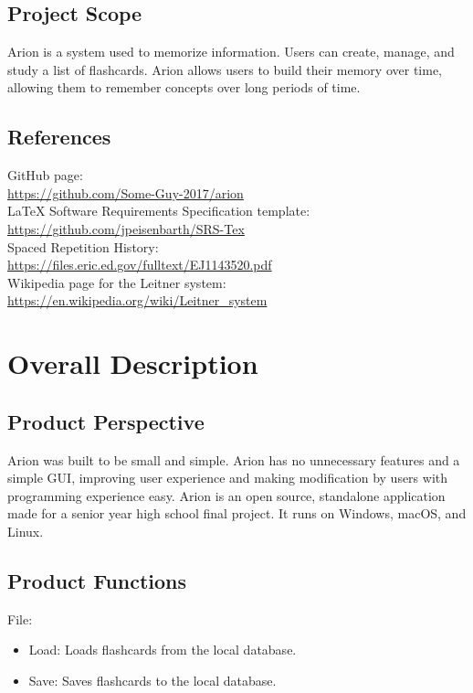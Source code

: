 \documentclass{scrreprt}
\begin{document}
\section{Project Scope}
Arion is a system used to memorize information. Users can create, manage, and study a list of flashcards.
Arion allows users to build their memory over time, allowing them to remember concepts over long periods of time.

\section{References}
\begin{flushleft} 
    GitHub page: \\
    \url{https://github.com/Some-Guy-2017/arion} \\
    LaTeX Software Requirements Specification template: \\
    \url{https://github.com/jpeisenbarth/SRS-Tex} \\
    Spaced Repetition History: \\
    \url{https://files.eric.ed.gov/fulltext/EJ1143520.pdf} \\
    Wikipedia page for the Leitner system: \\
    \url{https://en.wikipedia.org/wiki/Leitner_system} \\
\end{flushleft}


\chapter{Overall Description}

\section{Product Perspective}
Arion was built to be small and simple.
Arion has no unnecessary features and a simple GUI, improving user experience and making modification by users
with programming experience easy.
Arion is an open source, standalone application made for a senior year high school final project.
It runs on Windows, macOS, and Linux.

\section{Product Functions}
File:
\begin{itemize}
    \item Load: Loads flashcards from the local database.
    \item Save: Saves flashcards to the local database.
\end{itemize}
\end{document}
